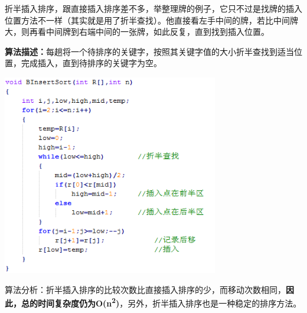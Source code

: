 {{折半插入排序，跟直接插入排序差不多}，举整理牌的例子，它只不过是找牌的插入位置方法不一样（其实就是用了折半查找）。他直接看左手中间的牌，若比中间牌大，则再看中间牌到右端中间的一张牌，如此反复，直到找到插入位置。}

{\textbf{算法描述：}每趟将一个待排序的关键字，按照其关键字值的大小折半查找到适当位置，完成插入，直到待排序的关键字为空。}

\includegraphics[width=3.70833in,height=3.44792in]{png-jpeg-pics/BD1A9E6E13C293732C4D20448C4FAC01.png}

算法分析：折半插入排序的比较次数比直接插入排序的少，而移动次数相同，\textbf{{因此，总的时间复杂度仍为}{O(n}\textsuperscript{{2}}{)}}，另外，折半插入排序也是一种稳定的排序方法。
